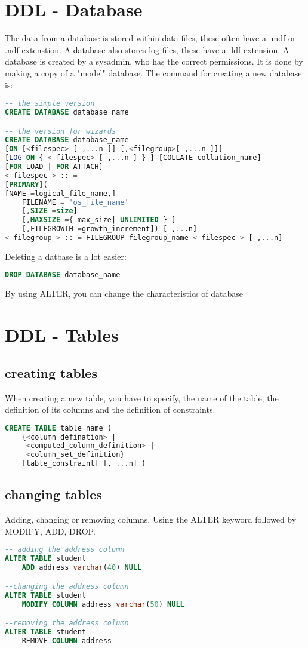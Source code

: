 \documentclass{report}
\begin{document}
 	\section{DDL - Database}
 	The data from a database is stored within data files, these often have a .mdf or .ndf extenstion. A database also stores log files, these have a .ldf extension.
 	A database is created by a sysadmin, who has the correct permissions. It is done by making a copy of a "model" database. 
 	The command for creating a new database is: 
 	\begin{lstlisting}[language=sql]
-- the simple version
CREATE DATABASE database_name

-- the version for wizards
CREATE DATABASE database_name 
[ON [<filespec> [ ,...n ]] [,<filegroup>[ ,...n ]]] 
[LOG ON { < filespec> [ ,...n ] } ] [COLLATE collation_name] 
[FOR LOAD | FOR ATTACH] 
< filespec > :: = 
[PRIMARY](
[NAME =logical_file_name,] 
	FILENAME = 'os_file_name' 
	[,SIZE =size] 
	[,MAXSIZE ={ max_size| UNLIMITED } ] 
	[,FILEGROWTH =growth_increment]) [ ,...n] 
< filegroup > :: = FILEGROUP filegroup_name < filespec > [ ,...n]\end{lstlisting}
	Deleting a datbase is a lot easier: 
	\begin{lstlisting}[language=sql]
DROP DATABASE database_name	\end{lstlisting}
	By using ALTER, you can change the characteristics of database
	\section{DDL - Tables}
	\subsection{creating tables}
	When creating a new table, you have to specify, the name of the table, the definition of its columns and the definition of constraints. 
	\begin{lstlisting}[language=sql]
CREATE TABLE table_name (
	{<column_defination> | 
	 <computed_column_definition> |
	 <column_set_definition}
	[table_constraint] [, ...n] )\end{lstlisting}

	\subsection{changing tables}
	Adding, changing or removing columns. Using the ALTER keyword followed by MODIFY, ADD, DROP. 
	\begin{lstlisting}[language=sql]
-- adding the address column
ALTER TABLE student
	ADD address varchar(40) NULL

--changing the address column
ALTER TABLE student
	MODIFY COLUMN address varchar(50) NULL

--removing the address column
ALTER TABLE student
	REMOVE COLUMN address\end{lstlisting}
\end{document}
